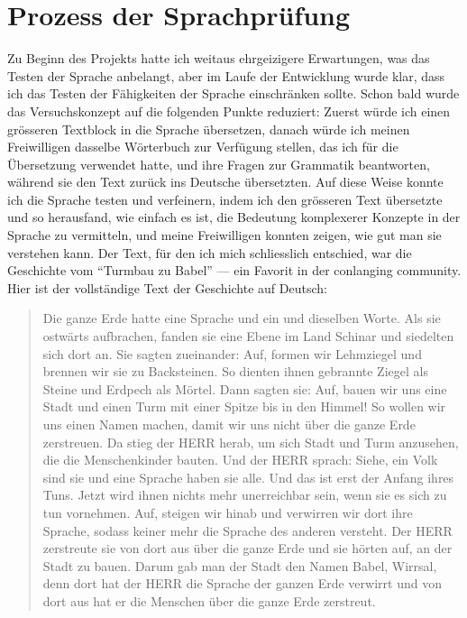 \documentclass{article}
\begin{document}
\section{Prozess der Sprachprüfung}
Zu Beginn des Projekts hatte ich weitaus ehrgeizigere Erwartungen, was das Testen der Sprache anbelangt,
aber im Laufe der Entwicklung wurde klar, dass ich das Testen der Fähigkeiten der Sprache einschränken sollte.
Schon bald wurde das Versuchskonzept auf die folgenden Punkte reduziert: Zuerst würde ich einen grösseren Textblock in die
Sprache übersetzen, danach würde ich meinen Freiwilligen dasselbe Wörterbuch zur Verfügung stellen, das ich für die Übersetzung
verwendet hatte, und ihre Fragen zur Grammatik beantworten, während sie den Text zurück ins Deutsche übersetzten.
Auf diese Weise konnte ich die Sprache testen und verfeinern, indem ich den grösseren Text übersetzte und so herausfand,
wie einfach es ist, die Bedeutung komplexerer Konzepte in der Sprache zu vermitteln, und meine Freiwilligen konnten zeigen,
wie gut man sie verstehen kann. Der Text, für den ich mich schliesslich entschied, war die Geschichte vom ``Turmbau zu Babel''
--- ein Favorit in der conlanging community. Hier ist der vollständige Text der Geschichte auf Deutsch:

\begin{quotation}
    Die ganze Erde hatte eine Sprache und ein und dieselben Worte.
    Als sie ostwärts aufbrachen, fanden sie eine Ebene im Land Schinar und siedelten sich dort an.
    Sie sagten zueinander: Auf, formen wir Lehmziegel und brennen wir sie zu Backsteinen.
    So dienten ihnen gebrannte Ziegel als Steine und Erdpech als Mörtel.
    Dann sagten sie: Auf, bauen wir uns eine Stadt und einen Turm mit einer Spitze bis in den Himmel!
    So wollen wir uns einen Namen machen, damit wir uns nicht über die ganze Erde zerstreuen.
    Da stieg der HERR herab, um sich Stadt und Turm anzusehen, die die Menschenkinder bauten.
    Und der HERR sprach: Siehe, ein Volk sind sie und eine Sprache haben sie alle.
    Und das ist erst der Anfang ihres Tuns. Jetzt wird ihnen nichts mehr unerreichbar sein, wenn sie es sich zu tun vornehmen.
    Auf, steigen wir hinab und verwirren wir dort ihre Sprache, sodass keiner mehr die Sprache des anderen versteht.
    Der HERR zerstreute sie von dort aus über die ganze Erde und sie hörten auf, an der Stadt zu bauen.
    Darum gab man der Stadt den Namen Babel, Wirrsal, denn dort hat der HERR die Sprache der ganzen Erde
    verwirrt und von dort aus hat er die Menschen über die ganze Erde zerstreut.\citep{bibel2020}
\end{quotation}
\end{document}
